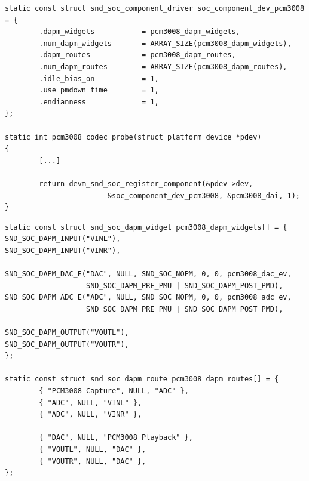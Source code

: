 \begin{frame}[fragile]{}
  \begin{block}{}
    \fontsize{9}{9}\selectfont
    \begin{verbatim}
static const struct snd_soc_component_driver soc_component_dev_pcm3008 = {
        .dapm_widgets           = pcm3008_dapm_widgets,
        .num_dapm_widgets       = ARRAY_SIZE(pcm3008_dapm_widgets),
        .dapm_routes            = pcm3008_dapm_routes,
        .num_dapm_routes        = ARRAY_SIZE(pcm3008_dapm_routes),
        .idle_bias_on           = 1,
        .use_pmdown_time        = 1,
        .endianness             = 1,
};

static int pcm3008_codec_probe(struct platform_device *pdev)
{
        [...]

        return devm_snd_soc_register_component(&pdev->dev,
                        &soc_component_dev_pcm3008, &pcm3008_dai, 1);
}
    \end{verbatim}
  \end{block}
\end{frame}

\begin{frame}[fragile]{}
  \begin{block}{}
    \fontsize{9}{9}\selectfont
    \begin{verbatim}
static const struct snd_soc_dapm_widget pcm3008_dapm_widgets[] = {
SND_SOC_DAPM_INPUT("VINL"),
SND_SOC_DAPM_INPUT("VINR"),

SND_SOC_DAPM_DAC_E("DAC", NULL, SND_SOC_NOPM, 0, 0, pcm3008_dac_ev,
                   SND_SOC_DAPM_PRE_PMU | SND_SOC_DAPM_POST_PMD),
SND_SOC_DAPM_ADC_E("ADC", NULL, SND_SOC_NOPM, 0, 0, pcm3008_adc_ev,
                   SND_SOC_DAPM_PRE_PMU | SND_SOC_DAPM_POST_PMD),

SND_SOC_DAPM_OUTPUT("VOUTL"),
SND_SOC_DAPM_OUTPUT("VOUTR"),
};

static const struct snd_soc_dapm_route pcm3008_dapm_routes[] = {
        { "PCM3008 Capture", NULL, "ADC" },
        { "ADC", NULL, "VINL" },
        { "ADC", NULL, "VINR" },

        { "DAC", NULL, "PCM3008 Playback" },
        { "VOUTL", NULL, "DAC" },
        { "VOUTR", NULL, "DAC" },
};
    \end{verbatim}
  \end{block}
\end{frame}

